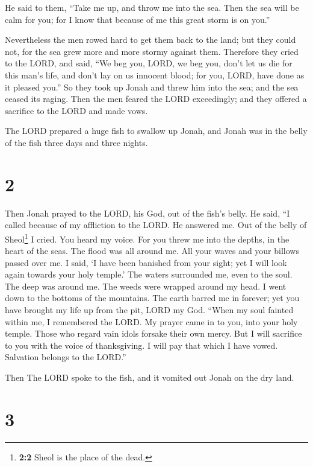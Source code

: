  He said to them, ``Take me up, and throw me into the
sea. Then the sea will be calm for you; for I know that because of me
this great storm is on you.''

 Nevertheless the men rowed hard to get them back to the
land; but they could not, for the sea grew more and more stormy against
them.  Therefore they cried to the LORD, and said, ``We
beg you, LORD, we beg you, don't let us die for this man's life, and
don't lay on us innocent blood; for you, LORD, have done as it pleased
you.''  So they took up Jonah and threw him into the sea;
and the sea ceased its raging.  Then the men feared the
LORD exceedingly; and they offered a sacrifice to the LORD and made
vows.

 The LORD prepared a huge fish to swallow up Jonah, and
Jonah was in the belly of the fish three days and three nights.

\hypertarget{section-1}{%
\section{2}\label{section-1}}

 Then Jonah prayed to the LORD, his God, out of the fish's
belly.  He said, ``I called because of my affliction to
the LORD. He answered me. Out of the belly of Sheol\footnote{\textbf{2:2}
  Sheol is the place of the dead.} I cried. You heard my voice.
 For you threw me into the depths, in the heart of the
seas. The flood was all around me. All your waves and your billows
passed over me.  I said, `I have been banished from your
sight; yet I will look again towards your holy temple.' 
The waters surrounded me, even to the soul. The deep was around me. The
weeds were wrapped around my head.  I went down to the
bottoms of the mountains. The earth barred me in forever; yet you have
brought my life up from the pit, LORD my God.  ``When my
soul fainted within me, I remembered the LORD. My prayer came in to you,
into your holy temple.  Those who regard vain idols
forsake their own mercy.  But I will sacrifice to you with
the voice of thanksgiving. I will pay that which I have vowed. Salvation
belongs to the LORD.''

 Then The LORD spoke to the fish, and it vomited out
Jonah on the dry land.

\hypertarget{section-2}{%
\section{3}\label{section-2}}

